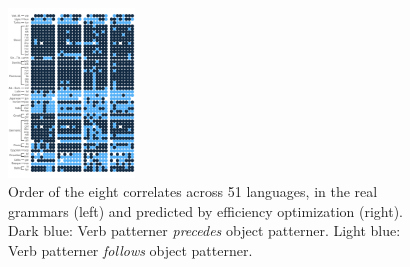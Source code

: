 \documentclass[9pt,twocolumn,twoside,lineno]{pnas-new}
\begin{document}
\begin{figure} %
	\begin{center}
	\includegraphics[width=0.3\textwidth]{../results/correlations/figures/pred-eff-families.pdf}
	\end{center}
	\caption{Order of the eight correlates across 51 languages, in the real grammars (left) and predicted by efficiency optimization (right). Dark blue: Verb patterner \emph{precedes} object patterner. Light blue: Verb patterner \emph{follows} object patterner.}\label{fig:per-lang}
\end{figure}
\end{document}
